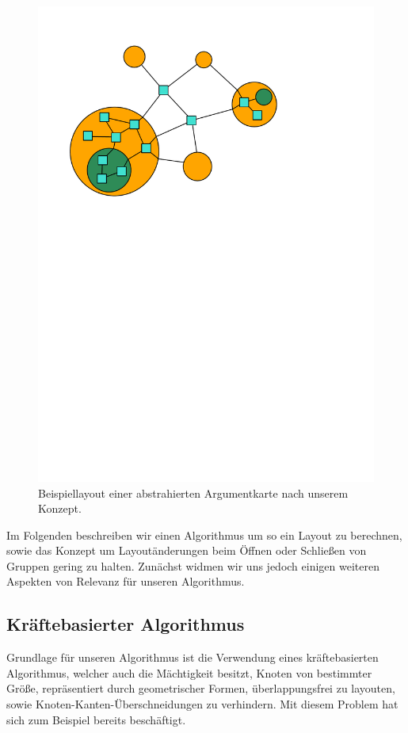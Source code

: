 \begin{figure}[h!]
\begin{center} 
  \includegraphics{Pics/Layoutbeispiel.pdf}
  \caption{Beispiellayout einer abstrahierten Argumentkarte nach unserem Konzept.}
  \label{f:Layoutbeispiel}
\end{center}
\end{figure}

Im Folgenden beschreiben wir einen Algorithmus um so ein Layout zu berechnen, 
sowie das Konzept um Layoutänderungen beim Öffnen oder Schließen von Gruppen gering zu halten.
Zunächst widmen wir uns jedoch einigen weiteren Aspekten von Relevanz für unseren Algorithmus.


\subsection*{Kräftebasierter Algorithmus}
Grundlage für unseren Algorithmus ist die Verwendung eines kräftebasierten Algorithmus, welcher auch die Mächtigkeit besitzt,
Knoten von bestimmter Größe, repräsentiert durch geometrischer Formen, überlappungsfrei zu layouten, sowie Knoten-Kanten-Überschneidungen zu verhindern.
Mit diesem Problem hat sich zum Beispiel bereits \cite{Harel:2002:DGN:1556262.1556288} beschäftigt.

